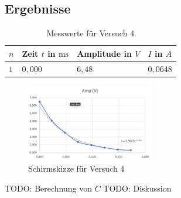     \subsection{Ergebnisse}
        
        \begin{table}[h!]
            \centering
            \begin{tabular}{|l|l|l|l|}
                \hline
                $n$ & Zeit $t$ in $\mathrm{ms}$ & Amplitude in $V$ & $I$ in $A$\\
                \hline\hline
                $1$ & $0,000$ & $6,48$ & $0,0648$\\
                \hline
            \end{tabular}
            \caption{Messwerte für Versuch 4}
            \label{tab:versuch4}
        \end{table}

        \begin{figure}[h!]
            \centering
            \includegraphics[width=0.5\textwidth]{bilder/Physik_05.png}
            \caption{Schirmskizze für Versuch 4}
            \label{fig:versuch4}
        \end{figure}

        TODO: Berechnung von $C$
        TODO: Diskussion